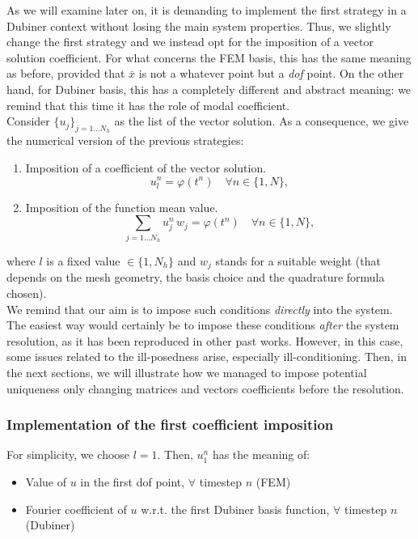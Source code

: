 \documentclass[a4paper,11pt]{article}
\begin{document}
\noindent As we will examine later on, it is demanding to implement the first strategy in a Dubiner context without losing the main system properties. Thus, we slightly change the first strategy and we instead opt for the imposition of a vector solution coefficient. For what concerns the FEM basis, this has the same meaning as before, provided that $\bar{x}$ is not a whatever point but a \emph{dof} point. On the other hand, for Dubiner basis, this has a completely different and abstract meaning: we remind that this time it has the role of modal coefficient. \\

\noindent Consider $\{u_j\}_{j=1 \dots N_h}$ as the list of the vector solution. As a consequence, we give the numerical version of the previous strategies:
\begin{enumerate}
	\item Imposition of a coefficient of the vector solution.
	\begin{equation*}
	u_l^n = \varphi(t^n) \quad \forall n \in \{1,N\},
	\end{equation*}
	\item Imposition of the function mean value.
	\begin{equation*}
	\sum_{j=1\dots N_h} u_j^n \, w_j = \varphi(t^n)\quad \forall n \in \{1,N\},
	\end{equation*}
\end{enumerate}	
where $l$ is a fixed value $\in \{1,N_h\}$ and $w_j$ stands for a suitable weight (that depends on the mesh geometry, the basis choice and the quadrature formula chosen). \\

\noindent We remind that our aim is to impose such conditions \emph{directly} into the system. The easiest way would certainly be to impose these conditions \emph{after} the system resolution, as it has been reproduced in other past works. However, in this case, some issues related to the ill-posedness arise, especially ill-conditioning. Then, in the next sections, we will illustrate how we managed to impose potential uniqueness only changing matrices and vectors coefficients before the resolution.

\subsubsection{Implementation of the first coefficient imposition} \label{first_coeff_implementation}
For simplicity, we choose $l=1$. Then, $u_1^n$ has the meaning of:
\begin{itemize}
	\item Value of $u$ in the first dof point, $\forall$ timestep $n$ (FEM)
	\item Fourier coefficient of $u$ w.r.t. the first Dubiner basis function, $\forall$ timestep $n$ (Dubiner)
\end{itemize}
\end{document}
